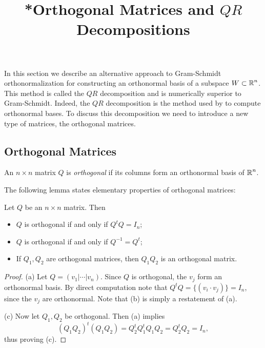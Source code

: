 \documentclass{ximera}
\title{*Orthogonal Matrices and $QR$ Decompositions}
\begin{document}
\begin{abstract}
\end{abstract}
\maketitle


\label{S:QR}

In this section we describe an alternative approach to Gram-Schmidt
orthonormalization for constructing an orthonormal basis of a subspace
$W\subset\mbox{$\Bbb{R}$}^n$.  This method is called the $QR$ decomposition and is
numerically
superior to Gram-Schmidt.  Indeed, the $QR$ decomposition is the method used by
\Matlab to compute orthonormal bases.  To discuss this decomposition we need
to introduce a new type of matrices, the orthogonal matrices.

\subsection*{Orthogonal Matrices}

\begin{definition} \label{def:orthmat}
An $n\times n$ matrix $Q$ is {\em orthogonal\/} if its columns form an
orthonormal basis
of $\mbox{$\Bbb{R}$}^n$.
\end{definition}

The following lemma states elementary properties of orthogonal matrices:
\begin{lemma} \label{lem:orthprop}
Let $Q$ be an $n\times n$ matrix.  Then
\begin{itemize}
\item[(a)] $Q$ is orthogonal if and only if $Q^tQ=I_n$;
\item[(b)] $Q$ is orthogonal if and only if $Q^{-1} = Q^t$;
\item[(c)] If $Q_1,Q_2$ are orthogonal matrices, then $Q_1Q_2$ is
an orthogonal matrix.
\end{itemize}
\end{lemma}
\begin{proof}  (a) Let $Q=(v_1|\cdots|v_n)$.  Since $Q$ is orthogonal, the $v_j$
form an orthonormal basis.  By direct computation note that
$Q^tQ=\{(v_i\cdot v_j)\}=I_n$, since the $v_j$ are orthonormal. Note that
(b) is simply a restatement of (a).

\noindent (c) Now let $Q_1,Q_2$ be orthogonal. Then (a) implies
\[
(Q_1Q_2)^t(Q_1Q_2) = Q_2^tQ_1^tQ_1Q_2 = Q_2^tQ_2 = I_n,
\]
thus proving (c).  \end{proof}
\end{document}
